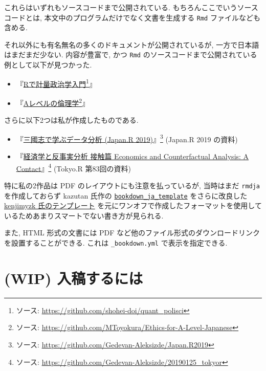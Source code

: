 \documentclass[
]{bxjsbook}
\providecommand{\tightlist}{%
  \setlength{\itemsep}{0pt}\setlength{\parskip}{0pt}}
\theoremstyle{definition}
\theoremstyle{definition}
\theoremstyle{definition}
\theoremstyle{remark}
\begin{document}
これらはいずれもソースコードまで公開されている.
もちろんここでいうソースコードとは,
本文中のプログラムだけでなく文書を生成する \texttt{Rmd}
ファイルなども含める.

それ以外にも有名無名の多くのドキュメントが公開されているが,
一方で日本語はまだまだ少ない. 内容が豊富で, かつ \texttt{Rmd}
のソースコードまで公開されている例として以下が見つかった.

\begin{itemize}
\tightlist
\item
  『\href{https://shohei-doi.github.io/quant_polisci/}{Rで計量政治学入門}\footnote{ソース:
    \url{https://github.com/shohei-doi/quant_polisci}}』
\item
  『\href{https://mtoyokura.github.io/Ethics-for-A-Level-Japanese/}{Aレベルの倫理学}\footnote{ソース:
    \url{https://github.com/MToyokura/Ethics-for-A-Level-Japanese}}』
\end{itemize}

さらに以下2つは私が作成したものである.

\begin{itemize}
\tightlist
\item
  『\href{https://gedevan-aleksizde.github.io/Japan.R2019/}{三國志で学ぶデータ分析
  (Japan.R 2019)}』\footnote{ソース:
    \url{https://github.com/Gedevan-Aleksizde/Japan.R2019}} (Japan.R
  2019 の資料)
\item
  『\href{https://gedevan-aleksizde.github.io/20190125_tokyor/}{経済学と反事実分析
  接触篇 Economics and Counterfactual Analysis: A Contact}』\footnote{ソース:
    \url{https://github.com/Gedevan-Aleksizde/20190125_tokyor}} (Tokyo.R
  第83回の資料)
\end{itemize}

特に私の2作品は PDF のレイアウトにも注意を払っているが, 当時はまだ
\texttt{rmdja} を作成しておらず kazutan 氏作の
\href{https://github.com/kazutan/bookdown_ja_template}{\texttt{bookdown\_ja\_template}}
をさらに改良した
\href{https://github.com/kenjimyzk/bookdown_ja_template}{kenjimyzk
氏のテンプレート}
を元にワンオフで作成したフォーマットを使用しているためあまりスマートでない書き方が見られる.

また, HTML 形式の文書には PDF
など他のファイル形式のダウンロードリンクを設置することができる. これは
\texttt{\_bookdown.yml} で表示を指定できる.

\hypertarget{wip-ux5165ux7a3fux3059ux308bux306bux306f}{%
\section{(WIP)
入稿するには}\label{wip-ux5165ux7a3fux3059ux308bux306bux306f}}
\end{document}

